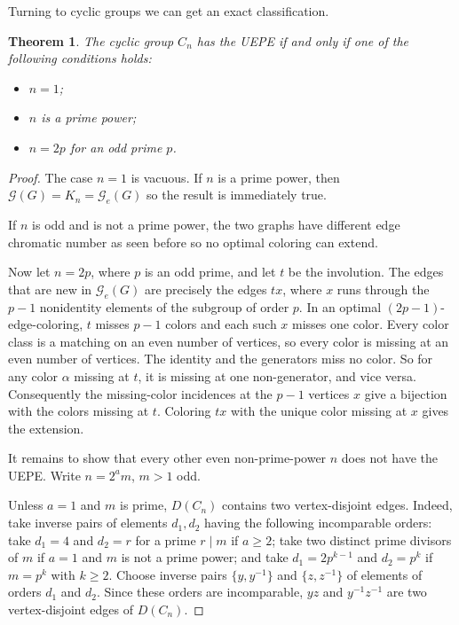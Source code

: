 \documentclass{article}
\newtheorem{theorem}{Theorem}[section]
\theoremstyle{definition}
\theoremstyle{indentclaim}
\theoremstyle{named}
\theoremstyle{named}
\begin{document}
\bigskip

Turning to cyclic groups we can get an exact classification. 

\begin{theorem}\label{thm:cyclic-exact}
The cyclic group $C_n$ has the UEPE if and only
if one of the following conditions holds: 
\begin{itemize}
    \item $n=1$; 
    \item $n$ is a prime power; 
    \item $n=2p$ for an odd prime $p$. 
\end{itemize}
\end{theorem}

\begin{proof}
The case $n=1$ is vacuous. If $n$ is a prime power, then $\mathscr G(G) = K_n = \mathscr G_e(G)$ so the result is immediately true. 

If $n$ is odd and is not a prime power, the two graphs have different edge chromatic number as seen before so no optimal coloring can extend. 

Now let $n=2p$, where $p$ is an odd prime, and let $t$ be the involution.
The edges that are new in $\mathscr G_e(G)$ are precisely the edges $tx$, where $x$ runs through the
$p-1$ nonidentity elements of the subgroup of order $p$. In an optimal
$(2p-1)$-edge-coloring, $t$ misses $p-1$ colors and each such $x$ misses
one color. Every color class is a matching on an even number of vertices,
so every color is missing at an even number of vertices. The identity and
the generators miss no color. So for any color $\alpha$ missing at $t$, it is missing at one non-generator, and vice versa. Consequently the missing-color incidences
at the $p-1$ vertices $x$ give a bijection with the colors missing at $t$.
Coloring $tx$ with the unique color missing at $x$ gives the extension.

It remains to show that every other even non-prime-power $n$ does not have the UEPE.  Write $n=2^a m$, $m>1$ odd.

Unless $a=1$ and $m$ is prime, $D(C_n)$ contains two vertex-disjoint edges.
Indeed, take inverse pairs of elements $d_1, d_2$ having the following incomparable orders: take $d_1=4$ and $d_2=r$ for a prime $r\mid m$ if
$a\ge2$; take two distinct prime divisors of $m$ if $a=1$ and $m$
is not a prime power; and take $d_1=2p^{k-1}$ and $d_2=p^k$ if
$m=p^k$ with $k\ge2$. Choose inverse pairs
$\{y,y^{-1}\}$ and $\{z,z^{-1}\}$ of elements of orders $d_1$ and
$d_2$. Since these orders are incomparable, $yz$ and
$y^{-1}z^{-1}$ are two vertex-disjoint edges of $D(C_n)$.


\end{proof}
\end{document}
